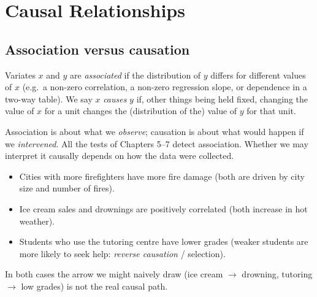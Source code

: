 \chapter{Causal Relationships}

\section{Association versus causation}

\begin{definition}
Variates $x$ and $y$ are \emph{associated} if the distribution of $y$ differs for
different values of $x$ (e.g.\ a non-zero correlation, a non-zero regression slope, or
dependence in a two-way table). We say $x$ \emph{causes} $y$ if, other things being held
fixed, changing the value of $x$ for a unit changes the (distribution of the) value of $y$
for that unit.
\end{definition}

Association is about what we \emph{observe}; causation is about what would happen if we
\emph{intervened}. All the tests of Chapters 5--7 detect association. Whether we may
interpret it causally depends on how the data were collected.

\begin{example}
\begin{itemize}
  \item Cities with more firefighters have more fire damage (both are driven by city
        size and number of fires).
  \item Ice cream sales and drownings are positively correlated (both increase in hot
        weather).
  \item Students who use the tutoring centre have lower grades (weaker students are more
        likely to seek help: \emph{reverse causation} / selection).
\end{itemize}
\end{example}

\begin{center}
\end{center}
In both cases the arrow we might naively draw (ice cream $\to$ drowning, tutoring $\to$
low grades) is not the real causal path.

